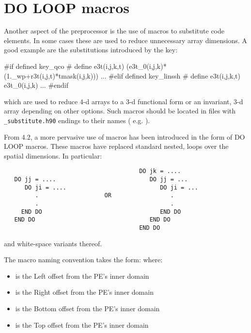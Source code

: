 \section{DO LOOP macros}

Another aspect of the preprocessor is the use of macros to substitute code elements. In some cases these are used
to reduce unnecessary array dimensions. A good example are the substitutions introduced by the  key:

\begin{clines}
#if defined key_qco
#   define  e3t(i,j,k,t)   (e3t_0(i,j,k)*(1._wp+r3t(i,j,t)*tmask(i,j,k)))
...
#elif defined key_linssh
#   define  e3t(i,j,k,t)   e3t_0(i,j,k)
...
#endif
\end{clines}

which are used to reduce 4-d arrays to a 3-d functional form or an invariant, 3-d array depending on other
options. Such macros should be located in files with \texttt{\_substitute.h90} endings to their names (
e.g. ).

From 4.2, a more pervasive use of macros has been introduced in the form of DO LOOP macros. These macros
have replaced standard nested, loops over the spatial dimensions. In particular:

\begin{verbatim}
                                       DO jk = ....
   DO jj = ....                           DO jj = ...
      DO ji = ....                           DO ji = ...
         .                   OR                 .
         .                                      .
     END DO                                  END DO
   END DO                                 END DO
                                       END DO
\end{verbatim}

and white-space variants thereof.

The macro naming convention takes the form:  where:
\begin{itemize}
\item {} is the Left   offset from the PE's inner domain
\item {} is the Right  offset from the PE's inner domain
\item {} is the Bottom offset from the PE's inner domain
\item {} is the Top    offset from the PE's inner domain
\end{itemize}

